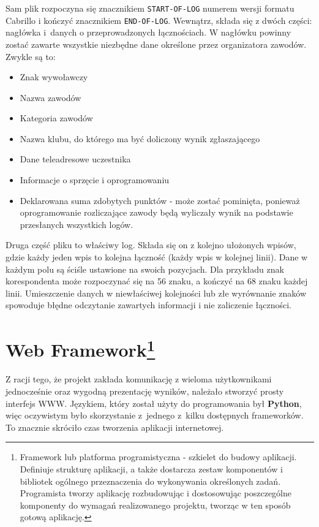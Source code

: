 \documentclass[]{mgr}
\begin{document}
            Sam plik rozpoczyna się znacznikiem \texttt{START-OF-LOG} numerem wersji formatu Cabrillo i kończyć znacznikiem \texttt{END-OF-LOG}. Wewnątrz, składa się z dwóch części: nagłówka i~danych o przeprowadzonych łącznościach. W nagłówku powinny zostać zawarte wszystkie niezbędne dane określone przez organizatora zawodów. Zwykle są to:
            \begin{itemize}
                \item Znak wywoławczy
                \item Nazwa zawodów
                \item Kategoria zawodów
                \item Nazwa klubu, do którego ma być doliczony wynik zgłaszającego
                \item Dane teleadresowe uczestnika
                \item Informacje o sprzęcie i oprogramowaniu
                \item Deklarowana suma zdobytych punktów - może zostać pominięta, ponieważ oprogramowanie rozliczające zawody będą wyliczały wynik na podstawie przesłanych wszystkich logów.
            \end{itemize}
            Druga część pliku to właściwy log. Składa się on z kolejno ułożonych wpisów, gdzie każdy jeden wpis to kolejna łączność (każdy wpis w kolejnej linii). Dane w każdym polu są ściśle ustawione na swoich pozycjach. Dla przykładu znak korespondenta może rozpoczynać się na 56 znaku, a kończyć na 68 znaku każdej linii. Umieszczenie danych w niewłaściwej kolejności lub złe wyrównanie znaków spowoduje błędne odczytanie zawartych informacji i nie zaliczenie łączności.

        \section[Web Framework]{Web Framework\footnote{Framework lub platforma programistyczna - szkielet do budowy aplikacji. Definiuje strukturę aplikacji, a także dostarcza zestaw komponentów i bibliotek ogólnego przeznaczenia do wykonywania określonych zadań. Programista tworzy aplikację rozbudowując i dostosowując poszczególne komponenty do wymagań realizowanego projektu, tworząc w ten sposób gotową aplikację.}}
        Z racji tego, że projekt zakłada komunikację z wieloma użytkownikami jednocześnie oraz wygodną prezentację wyników, należało stworzyć prosty interfejs WWW. Językiem, który został użyty do programowania był \textbf{Python}, więc oczywistym było skorzystanie z~jednego z~kilku dostępnych frameworków. To znacznie skróciło czas tworzenia aplikacji internetowej.
\end{document}
